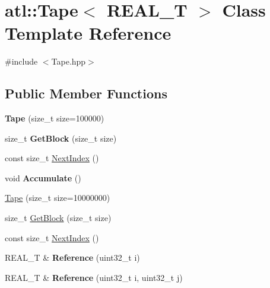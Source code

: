 \hypertarget{classatl_1_1_tape}{\section{atl\+:\+:Tape$<$ R\+E\+A\+L\+\_\+\+T $>$ Class Template Reference}
\label{classatl_1_1_tape}
}


{\ttfamily \#include $<$Tape.\+hpp$>$}

\subsection*{Public Member Functions}
\begin{DoxyCompactItemize}
\item 
\hypertarget{classatl_1_1_tape_ab5c9657e3efac59a8ff196af2ec2850d}{{\bfseries Tape} (size\+\_\+t size=100000)}\label{classatl_1_1_tape_ab5c9657e3efac59a8ff196af2ec2850d}

\item 
\hypertarget{classatl_1_1_tape_aae53cfc50b4b2901f400d61d493b3d89}{size\+\_\+t {\bfseries Get\+Block} (size\+\_\+t size)}\label{classatl_1_1_tape_aae53cfc50b4b2901f400d61d493b3d89}

\item 
const size\+\_\+t \hyperlink{classatl_1_1_tape_a62931ab955573c27faa83056959add48}{Next\+Index} ()
\item 
\hypertarget{classatl_1_1_tape_a5466d55b5e2f3a463bbbe6521cf49359}{void {\bfseries Accumulate} ()}\label{classatl_1_1_tape_a5466d55b5e2f3a463bbbe6521cf49359}

\item 
\hyperlink{classatl_1_1_tape_a6ea5c0894ee230b8f7217743317c2519}{Tape} (size\+\_\+t size=10000000)
\item 
size\+\_\+t \hyperlink{classatl_1_1_tape_aae53cfc50b4b2901f400d61d493b3d89}{Get\+Block} (size\+\_\+t size)
\item 
const size\+\_\+t \hyperlink{classatl_1_1_tape_a62931ab955573c27faa83056959add48}{Next\+Index} ()
\item 
\hypertarget{classatl_1_1_tape_aad99808e9f19174a397eac6c26f092bb}{R\+E\+A\+L\+\_\+\+T \& {\bfseries Reference} (uint32\+\_\+t i)}\label{classatl_1_1_tape_aad99808e9f19174a397eac6c26f092bb}

\item 
\hypertarget{classatl_1_1_tape_a540945c7ce2e849eb6e748b12d317a61}{R\+E\+A\+L\+\_\+\+T \& {\bfseries Reference} (uint32\+\_\+t i, uint32\+\_\+t j)}\label{classatl_1_1_tape_a540945c7ce2e849eb6e748b12d317a61}


\end{DoxyCompactItemize}
